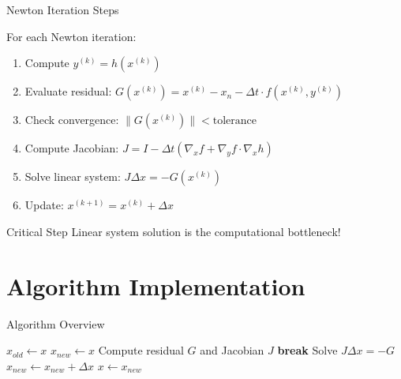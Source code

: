 \documentclass[10pt]{beamer}
\begin{document}
\begin{frame}{Newton Iteration Steps}
\begin{block}{For each Newton iteration:}
\begin{enumerate}
\item Compute $y^{(k)} = h(x^{(k)})$
\item Evaluate residual: $G(x^{(k)}) = x^{(k)} - x_n - \Delta t \cdot f(x^{(k)}, y^{(k)})$
\item Check convergence: $\|G(x^{(k)})\| < \text{tolerance}$
\item Compute Jacobian: $J = I - \Delta t (\nabla_x f + \nabla_y f \cdot \nabla_x h)$
\item Solve linear system: $J \Delta x = -G(x^{(k)})$
\item Update: $x^{(k+1)} = x^{(k)} + \Delta x$
\end{enumerate}
\end{block}

\pause
\begin{alertblock}{Critical Step}
Linear system solution is the computational bottleneck!
\end{alertblock}
\end{frame}

\section{Algorithm Implementation}

\begin{frame}[fragile]{Algorithm Overview}
\begin{algorithm}[H]
\caption{Backward Euler for DAEs}
\begin{algorithmic}[1]
    \State $x_{old} \gets x$
    \State $x_{new} \gets x$ 
        \State Compute residual $G$ and Jacobian $J$
         \textbf{break} \EndIf
        \State Solve $J \Delta x = -G$
        \State $x_{new} \gets x_{new} + \Delta x$
    \EndFor
    \State $x \gets x_{new}$
\EndFor
\EndProcedure
\end{algorithmic}
\end{algorithm}
\end{frame}
\end{document}

